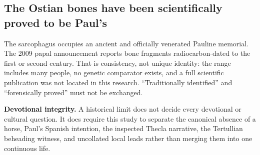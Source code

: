 \subsection{The Ostian bones have been scientifically proved to be Paul's}

The sarcophagus occupies an ancient and officially venerated Pauline memorial.
The 2009 papal announcement reports bone fragments radiocarbon-dated to the
first or second century. That is consistency, not unique identity: the range
includes many people, no genetic comparator exists, and a full scientific
publication was not located in this research. ``Traditionally identified''
and ``forensically proved'' must not be exchanged.

\begin{studyframe}
\textbf{Devotional integrity.} A historical limit does not decide every
devotional or cultural question. It does require this study to separate the
canonical absence of a horse, Paul's Spanish intention, the inspected Thecla
narrative, the Tertullian beheading witness, and uncollated local leads rather
than merging them into one continuous life.
\end{studyframe}
